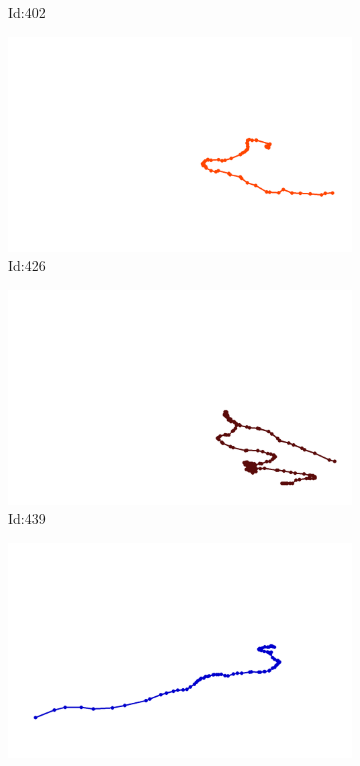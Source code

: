 \documentclass[12pt,twoside]{report}
\begin{document}
\begin{figure}
\begin{subfigure}[b]{0.20\textwidth}
\caption{Id:402}
\end{subfigure}
\begin{subfigure}[b]{0.20\textwidth}
\centering
\includegraphics[width=\textwidth]{../trajectories/426.png}
\caption{Id:426}
\end{subfigure}
\begin{subfigure}[b]{0.20\textwidth}
\centering
\includegraphics[width=\textwidth]{../trajectories/439.png}
\caption{Id:439}
\end{subfigure}
\begin{subfigure}[b]{0.20\textwidth}
\centering
\includegraphics[width=\textwidth]{../trajectories/480.png}

\end{subfigure}
\end{figure}
\end{document}
